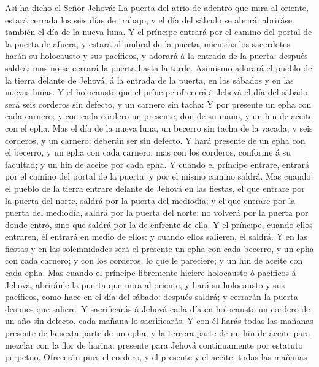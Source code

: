  Así ha dicho el Señor Jehová: La puerta del atrio de
adentro que mira al oriente, estará cerrada los seis días de trabajo, y
el día del sábado se abrirá: abriráse también el día de la nueva luna.
 Y el príncipe entrará por el camino del portal de la puerta
de afuera, y estará al umbral de la puerta, mientras los sacerdotes
harán su holocausto y sus pacíficos, y adorará á la entrada de la
puerta: después saldrá; mas no se cerrará la puerta hasta la tarde.
 Asimismo adorará el pueblo de la tierra delante de Jehová,
á la entrada de la puerta, en los sábados y en las nuevas lunas.
 Y el holocausto que el príncipe ofrecerá á Jehová el día
del sábado, será seis corderos sin defecto, y un carnero sin tacha:
 Y por presente un epha con cada carnero; y con cada cordero
un presente, don de su mano, y un hin de aceite con el epha.
 Mas el día de la nueva luna, un becerro sin tacha de la
vacada, y seis corderos, y un carnero: deberán ser sin defecto.
 Y hará presente de un epha con el becerro, y un epha con
cada carnero: mas con los corderos, conforme á su facultad; y un hin de
aceite por cada epha.  Y cuando el príncipe entrare, entrará
por el camino del portal de la puerta: y por el mismo camino saldrá.
 Mas cuando el pueblo de la tierra entrare delante de Jehová
en las fiestas, el que entrare por la puerta del norte, saldrá por la
puerta del mediodía; y el que entrare por la puerta del mediodía, saldrá
por la puerta del norte: no volverá por la puerta por donde entró, sino
que saldrá por la de enfrente de ella.  Y el príncipe,
cuando ellos entraren, él entrará en medio de ellos: y cuando ellos
salieren, él saldrá.  Y en las fiestas y en las
solemnidades será el presente un epha con cada becerro, y un epha con
cada carnero; y con los corderos, lo que le pareciere; y un hin de
aceite con cada epha.  Mas cuando el príncipe libremente
hiciere holocausto ó pacíficos á Jehová, abriránle la puerta que mira al
oriente, y hará su holocausto y sus pacíficos, como hace en el día del
sábado: después saldrá; y cerrarán la puerta después que saliere.
 Y sacrificarás á Jehová cada día en holocausto un cordero
de un año sin defecto, cada mañana lo sacrificarás.  Y con
él harás todas las mañanas presente de la sexta parte de un epha, y la
tercera parte de un hin de aceite para mezclar con la flor de harina:
presente para Jehová continuamente por estatuto perpetuo. 
Ofrecerán pues el cordero, y el presente y el aceite, todas las mañanas
